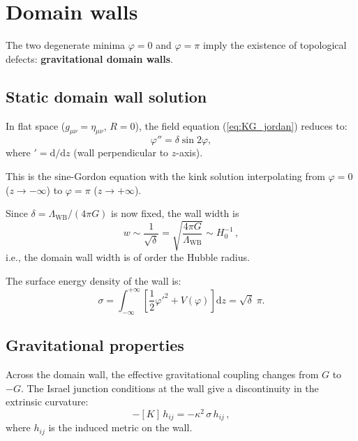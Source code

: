 \documentclass[aps,prd,twocolumn,superscriptaddress,nofootinbib]{revtex4-2}
\newcommand{\dd}{\mathrm{d}}
\newcommand{\Lw}{\Lambda_{\mathrm{WB}}}
\begin{document}
\section{Domain walls}
\label{sec:domain_walls}

The two degenerate minima $\varphi = 0$ and $\varphi = \pi$
imply the existence of topological defects:
\textbf{gravitational domain walls}.

\subsection{Static domain wall solution}

In flat space ($g_{\mu\nu} = \eta_{\mu\nu}$, $R = 0$),
the field equation (\ref{eq:KG_jordan}) reduces to:
\begin{equation}
  \varphi'' = \delta\sin 2\varphi,
\end{equation}
where $' = \dd/\dd z$ (wall perpendicular to $z$-axis).

This is the sine-Gordon equation with the kink solution
interpolating from $\varphi = 0$ ($z \to -\infty$)
to $\varphi = \pi$ ($z \to +\infty$).

Since $\delta = \Lw/(4\pi G)$ is now fixed, the wall width is
\begin{equation}
  w \sim \frac{1}{\sqrt{\delta}}
  = \sqrt{\frac{4\pi G}{\Lw}}
  \sim H_0^{-1}\,,
  \label{eq:wall_width}
\end{equation}
i.e., the domain wall width is of order the Hubble radius.

The surface energy density of the wall is:
\begin{equation}
  \sigma = \int_{-\infty}^{+\infty}
  \left[\frac{1}{2}\varphi'^2 + V(\varphi)\right]\dd z
  = \sqrt{\delta}\;\pi.
\end{equation}

\subsection{Gravitational properties}

Across the domain wall, the effective gravitational coupling
changes from $G$ to $-G$.
The Israel junction conditions at the wall give
a discontinuity in the extrinsic curvature:
\begin{equation}
  [K_{ij}] - [K]\,h_{ij} = -\kappa^2\,\sigma\,h_{ij}\,,
\end{equation}
where $h_{ij}$ is the induced metric on the wall.
\end{document}
